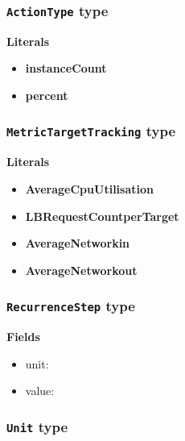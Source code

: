 \subsubsection{\texttt{ActionType} type}

\textbf{Literals}
\begin{itemize}
\item \textbf{instanceCount} 
\end{itemize}
\begin{itemize}
\item \textbf{percent} 
\end{itemize}

\subsubsection{\texttt{MetricTargetTracking} type}

\textbf{Literals}
\begin{itemize}
\item \textbf{AverageCpuUtilisation} 
\end{itemize}
\begin{itemize}
\item \textbf{LBRequestCountperTarget} 
\end{itemize}
\begin{itemize}
\item \textbf{AverageNetworkin} 
\end{itemize}
\begin{itemize}
\item \textbf{AverageNetworkout} 
\end{itemize}

\subsubsection{\texttt{RecurrenceStep} type}

\textbf{Fields}
\begin{itemize}
\item unit: 
\end{itemize}
\begin{itemize}
\item value: 
\end{itemize}

\subsubsection{\texttt{Unit} type}

